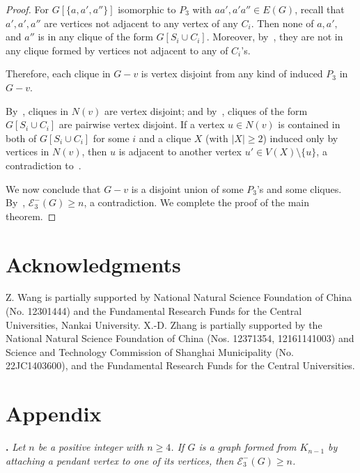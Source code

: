 \documentclass[a4paper,12pt]{article}
\theoremstyle{plain}
\begin{document}
\begin{proof}
For $G[\{a,a', a''\}]$ isomorphic to $P_3$ with $aa', a'a''\in E(G)$, recall that $a', a', a''$ are vertices not adjacent to any vertex of any $C_i$. Then none of $a,a',$ and $a''$ is in any clique of the form $G[S_i\cup C_i]$. Moreover, by~, they are not in any clique formed by vertices not adjacent to any of $C_i$'s.
 

Therefore, each clique in $G-v$ is vertex disjoint from any kind of induced $P_3$ in $G-v$.


By~, cliques in $N(v)$ are vertex disjoint; and by~, cliques of the form $G[S_i\cup C_i]$ are pairwise vertex disjoint. If a vertex $u\in N(v)$ is contained in both of $G[S_i\cup C_i]$ for some $i$ and a clique $X$ (with $|X|\geq 2$) induced only by vertices in $N(v)$, then $u$ is adjacent to another vertex $u'\in V(X)\setminus \{u\}$, a contradiction to~. 

We now conclude that $G-v$ is a disjoint union of some $P_3$'s and some cliques. By~, $\mathcal{E}_3^{-}(G) \geq n$, a contradiction. We complete the proof of the main theorem.  
\end{proof}


\section*{Acknowledgments}
Z. Wang is partially supported by National Natural Science Foundation of China (No. 12301444) and the Fundamental Research Funds for the Central Universities, Nankai University.
X.-D. Zhang is partially supported by  the National Natural Science Foundation of China (Nos. 12371354, 12161141003) and Science and Technology Commission of Shanghai Municipality (No. 22JC1403600), and the Fundamental Research Funds for the Central Universities. 

  
    


\newpage
\section*{Appendix}

\noindent
{\bf {}.}
\emph{Let $n$ be a positive integer with $n\geq 4$. If $G$ is a graph formed from $K_{n-1}$ by attaching a pendant vertex to one of its vertices, then $\mathcal{E}_3^{-}(G)\geq n$.}
\end{document}

